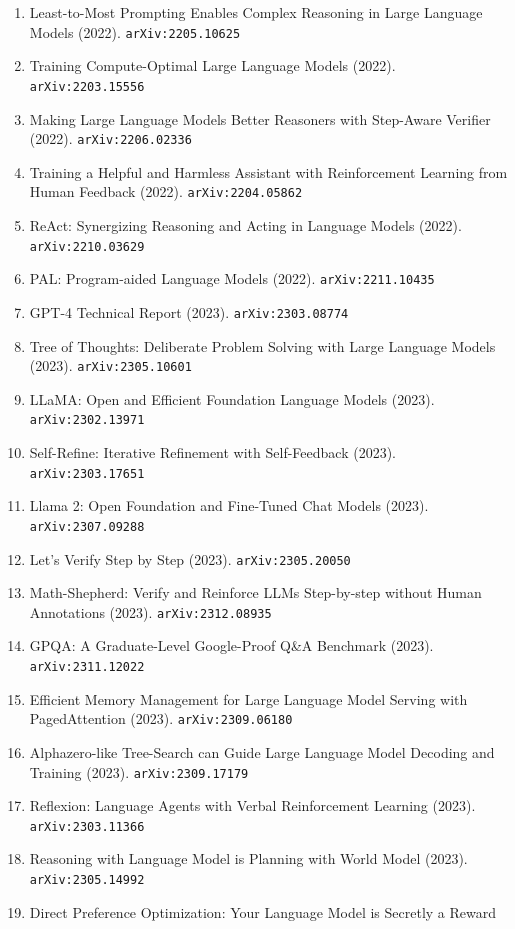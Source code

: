 \documentclass[11pt]{article}
\begin{document}
\begin{enumerate}
  \item Least-to-Most Prompting Enables Complex Reasoning in Large Language
  Models (2022). \texttt{arXiv:2205.10625}
  \item Training Compute-Optimal Large Language Models (2022). \texttt{arXiv:2203.15556}
  \item Making Large Language Models Better Reasoners with Step-Aware Verifier (2022). \texttt{arXiv:2206.02336}
  \item Training a Helpful and Harmless Assistant with Reinforcement Learning
  from Human Feedback (2022). \texttt{arXiv:2204.05862}
  \item ReAct: Synergizing Reasoning and Acting in Language Models (2022). \texttt{arXiv:2210.03629}
  \item PAL: Program-aided Language Models (2022). \texttt{arXiv:2211.10435}
  \item GPT-4 Technical Report (2023). \texttt{arXiv:2303.08774}
  \item Tree of Thoughts: Deliberate Problem Solving with Large Language Models (2023). \texttt{arXiv:2305.10601}
  \item LLaMA: Open and Efficient Foundation Language Models (2023). \texttt{arXiv:2302.13971}
  \item Self-Refine: Iterative Refinement with Self-Feedback (2023). \texttt{arXiv:2303.17651}
  \item Llama 2: Open Foundation and Fine-Tuned Chat Models (2023). \texttt{arXiv:2307.09288}
  \item Let's Verify Step by Step (2023). \texttt{arXiv:2305.20050}
  \item Math-Shepherd: Verify and Reinforce LLMs Step-by-step without Human
  Annotations (2023). \texttt{arXiv:2312.08935}
  \item GPQA: A Graduate-Level Google-Proof Q\&A Benchmark (2023). \texttt{arXiv:2311.12022}
  \item Efficient Memory Management for Large Language Model Serving with
  PagedAttention (2023). \texttt{arXiv:2309.06180}
  \item Alphazero-like Tree-Search can Guide Large Language Model Decoding and
  Training (2023). \texttt{arXiv:2309.17179}
  \item Reflexion: Language Agents with Verbal Reinforcement Learning (2023). \texttt{arXiv:2303.11366}
  \item Reasoning with Language Model is Planning with World Model (2023). \texttt{arXiv:2305.14992}
  \item Direct Preference Optimization: Your Language Model is Secretly a Reward

\end{enumerate}
\end{document}
